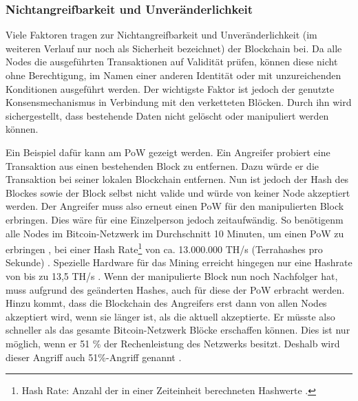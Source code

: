 \subsubsection{Nichtangreifbarkeit und Unveränderlichkeit}
\label{subsec:immutability}
Viele Faktoren tragen zur Nichtangreifbarkeit und Unveränderlichkeit (im weiteren Verlauf nur noch als Sicherheit bezeichnet) der Blockchain bei. Da alle Nodes die ausgeführten Transaktionen auf Validität prüfen, können diese nicht ohne Berechtigung, im Namen einer anderen Identität oder mit unzureichenden Konditionen ausgeführt werden. Der wichtigste Faktor ist jedoch der genutzte Konsensmechanismus in Verbindung mit den verketteten Blöcken. Durch ihn wird sichergestellt, dass bestehende Daten nicht gelöscht oder manipuliert werden können.

Ein Beispiel dafür kann am \acs{PoW} gezeigt werden. Ein Angreifer probiert eine Transaktion aus einen bestehenden Block zu entfernen. Dazu würde er die Transaktion bei seiner lokalen Blockchain entfernen. Nun ist jedoch der Hash des Blockes sowie der Block selbst nicht valide und würde von keiner Node akzeptiert werden. Der Angreifer muss also erneut einen \acs{PoW} für den manipulierten Block erbringen. Dies wäre für eine Einzelperson jedoch zeitaufwändig. So benötigenm alle Nodes im Bitcoin-Netzwerk im Durchschnitt 10 Minuten, um einen \acs{PoW} zu erbringen \cite[S.~173]{AntonopoulosMasteringbitcoin2015}, bei einer Hash Rate\footnote{Hash Rate: Anzahl der in einer Zeiteinheit berechneten Hashwerte \cite{BitcoinTeamBitcoinGlossar}.} von ca. 13.000.000 TH/s (Terrahashes pro Sekunde) \cite{EtherscanEthereumNetworkHashRate}. Spezielle Hardware für das Mining erreicht hingegen nur eine Hashrate von bis zu 13,5 TH/s \cite{BitcoinminingLearnBitcoinmining}. Wenn der manipulierte Block nun noch Nachfolger hat, muss aufgrund des geänderten Hashes, auch für diese der \acs{PoW} erbracht werden. Hinzu kommt, dass die Blockchain des Angreifers erst dann von allen Nodes akzeptiert wird, wenn sie länger ist, als die aktuell akzeptierte. Er müsste also schneller als das gesamte Bitcoin-Netzwerk Blöcke erschaffen können. Dies ist nur möglich, wenn er 51 \% der Rechenleistung des Netzwerks besitzt. Deshalb wird dieser Angriff auch 51\%-Angriff genannt \cite[S.~83]{SwanBlockchainblueprintnew2015} \cite{EthereumTeamEthereumWhitePaper2017}. 

